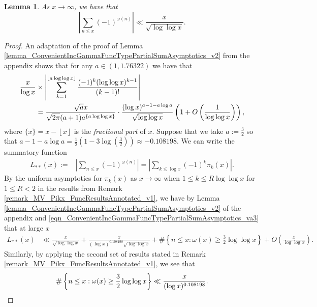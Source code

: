 \documentclass[11pt,reqno,a4letter]{article}
\numberwithin{figure}{section}
\numberwithin{table}{section}
\newcommand{\floor}[1]{\left\lfloor #1 \right\rfloor}
\theoremstyle{plain}
\newtheorem{lemma}[theorem]{Lemma}
\numberwithin{theorem}{section}
\theoremstyle{definition}
\begin{document}
\begin{lemma} 
\label{cor_AsymptoticsForSignedSumsOfomegan_v1}
As $x \rightarrow \infty$, we have that 
\[
\left\lvert \sum_{n \leq x} (-1)^{\omega(n)} \right\rvert \ll 
     \frac{x}{\sqrt{\log\log x}}. 
\]
\end{lemma}
\begin{proof}
An adaptation of the proof of Lemma \ref{lemma_ConvenientIncGammaFuncTypePartialSumAsymptotics_v2} 
from the appendix shows that for any $a \in (1, 1.76322)$ we have that 
\begin{align}
\notag 
\frac{x}{\log x} & \times \left\lvert \sum_{k=1}^{\floor{a\log\log x}} \frac{(-1)^{k} (\log\log x)^{k-1}}{(k-1)!} 
     \right\rvert \\ 
\label{eqn_ConvenientIncGammaFuncTypePartialSumAsymptotics_va3} 
     & = \frac{\sqrt{a} x}{\sqrt{2\pi}(a+1) a^{\{a\log\log x\}}} 
     \cdot \frac{(\log x)^{a-1-a\log a}}{\sqrt{\log\log x}} 
     \left(1 + O\left(\frac{1}{\log\log x}\right)\right), 
\end{align}
where $\{x\} = x - \floor{x}$ is the \emph{fractional part} of $x$. 
Suppose that we take $a := \frac{3}{2}$ so that 
$a-1-a\log a = \frac{1}{2}\left(1-3\log\left(\frac{3}{2}\right)\right) \approx -0.108198$. 
We can write the summatory function 
\begin{align*}
L_{\ast\ast}(x) := & \left\lvert \sum_{n \leq x} (-1)^{\omega(n)} \right\rvert = 
     \left\lvert \sum_{k \leq \log x} (-1)^{k} \pi_k(x) \right\rvert. 
\end{align*} 
By the uniform asymptotics for $\pi_k(x)$ as $x \rightarrow \infty$ when $1 \leq k \leq R \log\log x$ for 
$1 \leq R < 2$ in the results from 
Remark \ref{remark_MV_Pikx_FuncResultsAnnotated_v1}, 
we have by Lemma \ref{lemma_ConvenientIncGammaFuncTypePartialSumAsymptotics_v2} 
of the appendix and 
\eqref{eqn_ConvenientIncGammaFuncTypePartialSumAsymptotics_va3} that at large $x$ 
\begin{align*}
L_{\ast\ast}(x) & \ll \frac{x}{\sqrt{\log\log x}} + 
     \frac{x}{(\log x)^{0.108198} \sqrt{\log\log x}} + 
     \#\left\{n \leq x: \omega(x) \geq \frac{3}{2}\log\log x\right\} + O\left(
     \frac{x}{\log\log x}\right). 
\end{align*} 
Similarly, by applying the second set of results stated in 
Remark \ref{remark_MV_Pikx_FuncResultsAnnotated_v1}, we see that 
\[
\#\left\{n \leq x: \omega(x) \geq \frac{3}{2}\log\log x\right\} \ll 
     \frac{x}{(\log x)^{0.108198}}. 
     \qedhere 
\]
\end{proof}
\end{document}

